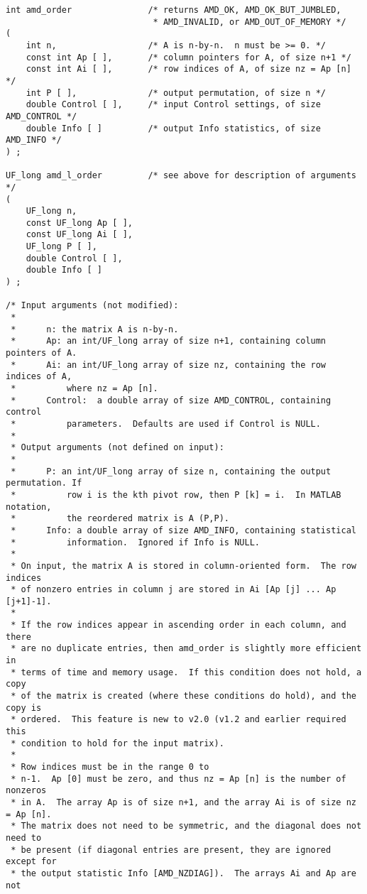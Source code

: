 \documentclass[11pt]{article}
\begin{document}
{\begin{verbatim}
int amd_order               /* returns AMD_OK, AMD_OK_BUT_JUMBLED,
                             * AMD_INVALID, or AMD_OUT_OF_MEMORY */
(
    int n,                  /* A is n-by-n.  n must be >= 0. */
    const int Ap [ ],       /* column pointers for A, of size n+1 */
    const int Ai [ ],       /* row indices of A, of size nz = Ap [n] */
    int P [ ],              /* output permutation, of size n */
    double Control [ ],     /* input Control settings, of size AMD_CONTROL */
    double Info [ ]         /* output Info statistics, of size AMD_INFO */
) ;

UF_long amd_l_order         /* see above for description of arguments */
(
    UF_long n,
    const UF_long Ap [ ],
    const UF_long Ai [ ],
    UF_long P [ ],
    double Control [ ],
    double Info [ ]
) ;

/* Input arguments (not modified):
 *
 *      n: the matrix A is n-by-n.
 *      Ap: an int/UF_long array of size n+1, containing column pointers of A.
 *      Ai: an int/UF_long array of size nz, containing the row indices of A,
 *          where nz = Ap [n].
 *      Control:  a double array of size AMD_CONTROL, containing control
 *          parameters.  Defaults are used if Control is NULL.
 *
 * Output arguments (not defined on input):
 *
 *      P: an int/UF_long array of size n, containing the output permutation. If
 *          row i is the kth pivot row, then P [k] = i.  In MATLAB notation,
 *          the reordered matrix is A (P,P).
 *      Info: a double array of size AMD_INFO, containing statistical
 *          information.  Ignored if Info is NULL.
 *
 * On input, the matrix A is stored in column-oriented form.  The row indices
 * of nonzero entries in column j are stored in Ai [Ap [j] ... Ap [j+1]-1].
 *
 * If the row indices appear in ascending order in each column, and there
 * are no duplicate entries, then amd_order is slightly more efficient in
 * terms of time and memory usage.  If this condition does not hold, a copy
 * of the matrix is created (where these conditions do hold), and the copy is
 * ordered.  This feature is new to v2.0 (v1.2 and earlier required this
 * condition to hold for the input matrix).
 * 
 * Row indices must be in the range 0 to
 * n-1.  Ap [0] must be zero, and thus nz = Ap [n] is the number of nonzeros
 * in A.  The array Ap is of size n+1, and the array Ai is of size nz = Ap [n].
 * The matrix does not need to be symmetric, and the diagonal does not need to
 * be present (if diagonal entries are present, they are ignored except for
 * the output statistic Info [AMD_NZDIAG]).  The arrays Ai and Ap are not

\end{verbatim}}
\end{document}
